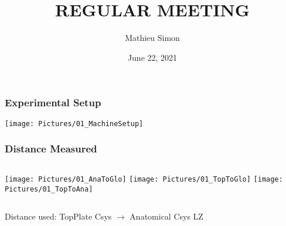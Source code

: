 \documentclass[xcolor=table]{beamer}
\title[Regular Meeting]{
\uppercase{Regular Meeting}
}
\author{Mathieu Simon}
\institute[University of Bern]
{
MSc - Biomedical Engineering \\
University of Bern, Faculty of Medicine \\
\medskip
}
\date{June 22, 2021}
\begin{document}
\begin{frame}
\titlepage
\end{frame}




\begin{frame}
	\frametitle{Experimental Setup}
	\centering
	\texttt{[image: Pictures/01\_MachineSetup]}
\end{frame}

\begin{frame}
	\frametitle{Distance Measured}
	\begin{columns}
		\texttt{[image: Pictures/01\_AnaToGlo]}
		\texttt{[image: Pictures/01\_TopToGlo]}
		\texttt{[image: Pictures/01\_TopToAna]}
	\end{columns}
	\centering\vspace{0.5cm}
	Distance used: TopPlate Csys $\rightarrow$ Anatomical Csys LZ
\end{frame}

\appendix


\end{document}
